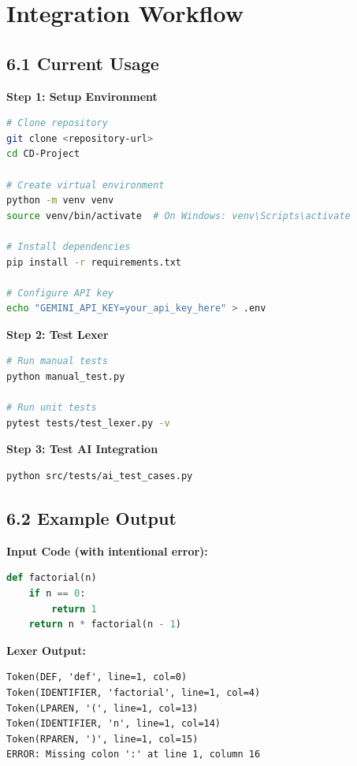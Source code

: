 \documentclass[a4paper,11pt]{article}
\begin{document}
\clearpage

\section{Integration Workflow}

\subsection{6.1 Current Usage}

\textbf{Step 1: Setup Environment}
\begin{lstlisting}[language=bash]
# Clone repository
git clone <repository-url>
cd CD-Project

# Create virtual environment
python -m venv venv
source venv/bin/activate  # On Windows: venv\Scripts\activate

# Install dependencies
pip install -r requirements.txt

# Configure API key
echo "GEMINI_API_KEY=your_api_key_here" > .env
\end{lstlisting}

\textbf{Step 2: Test Lexer}
\begin{lstlisting}[language=bash]
# Run manual tests
python manual_test.py

# Run unit tests
pytest tests/test_lexer.py -v
\end{lstlisting}

\textbf{Step 3: Test AI Integration}
\begin{lstlisting}[language=bash]
python src/tests/ai_test_cases.py
\end{lstlisting}

\subsection{6.2 Example Output}

\textbf{Input Code (with intentional error):}
\begin{lstlisting}[language=Python]
def factorial(n)
    if n == 0:
        return 1
    return n * factorial(n - 1)
\end{lstlisting}

\textbf{Lexer Output:}
\begin{lstlisting}
Token(DEF, 'def', line=1, col=0)
Token(IDENTIFIER, 'factorial', line=1, col=4)
Token(LPAREN, '(', line=1, col=13)
Token(IDENTIFIER, 'n', line=1, col=14)
Token(RPAREN, ')', line=1, col=15)
ERROR: Missing colon ':' at line 1, column 16
\end{lstlisting}
\end{document}

